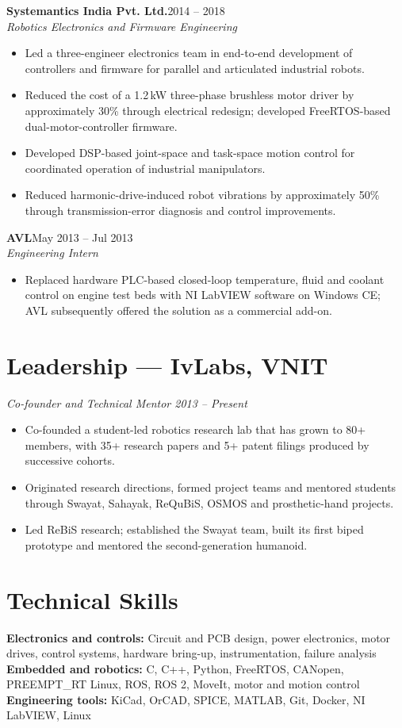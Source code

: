 \documentclass[11pt,a4paper]{article}
\newcommand{\role}[3]{%
  \Needspace{6\baselineskip}%
  \textbf{#1}\hfill #3\\
  \textit{#2}\par
}
\begin{document}
\role{Systemantics India Pvt. Ltd.}{Robotics Electronics and Firmware Engineering}{2014 -- 2018}
\begin{itemize}
  \item Led a three-engineer electronics team in end-to-end development
  of controllers and firmware for parallel and articulated industrial robots.
  \item Reduced the cost of a 1.2\,kW three-phase brushless motor driver
  by approximately 30\% through electrical redesign; developed
  FreeRTOS-based dual-motor-controller firmware.
  \item Developed DSP-based joint-space and task-space motion control
  for coordinated operation of industrial manipulators.
  \item Reduced harmonic-drive-induced robot vibrations by approximately
  50\% through transmission-error diagnosis and control improvements.
\end{itemize}

\role{AVL}{Engineering Intern}{May 2013 -- Jul 2013}
\begin{itemize}
  \item Replaced hardware PLC-based closed-loop temperature, fluid and
  coolant control on engine test beds with NI LabVIEW software on Windows CE;
  AVL subsequently offered the solution as a commercial add-on.
\end{itemize}

\section*{Leadership — IvLabs, VNIT}
\textit{Co-founder and Technical Mentor \hfill 2013 -- Present}
\begin{itemize}
  \item Co-founded a student-led robotics research lab that has grown
  to 80+ members, with 35+ research papers and 5+ patent filings produced
  by successive cohorts.
  \item Originated research directions, formed project teams and mentored
  students through Swayat, Sahayak, ReQuBiS, OSMOS and prosthetic-hand projects.
  \item Led ReBiS research; established the Swayat team, built its first
  biped prototype and mentored the second-generation humanoid.
\end{itemize}

\section*{Technical Skills}
\textbf{Electronics and controls:} Circuit and PCB design, power electronics,
motor drives, control systems, hardware bring-up, instrumentation,
failure analysis\\
\textbf{Embedded and robotics:} C, C++, Python, FreeRTOS, CANopen,
PREEMPT\_RT Linux, ROS, ROS 2, MoveIt, motor and motion control\\
\textbf{Engineering tools:} KiCad, OrCAD, SPICE, MATLAB, Git, Docker,
NI LabVIEW, Linux
\end{document}
